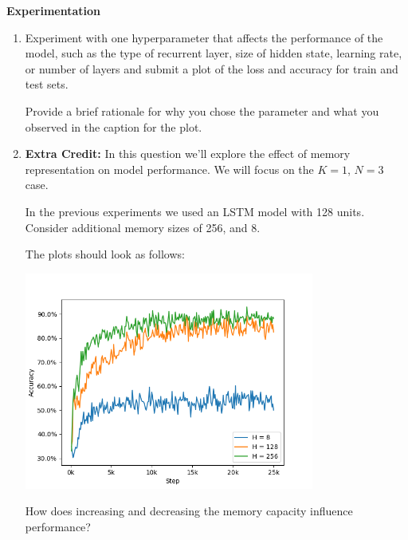 \item {} {\bf Experimentation}

\begin{enumerate}[label=\alph*]
    \item Experiment with one hyperparameter that affects the performance of the model, such as the type of recurrent layer, size of hidden state, learning rate, or number of layers and submit a plot of the loss and accuracy for train and test sets.
    
    Provide a brief rationale for why you chose the parameter and what you observed in the caption for the plot.    
    
    \item \textbf{Extra Credit:} In this question we'll explore the effect of memory representation on model performance. We will focus on the $K=1$, $N=3$ case.
    
    In the previous experiments we used an LSTM model with 128 units. Consider additional memory sizes of 256, and 8. 
    
    The plots should look as follows:
    \begin{center}
        \includegraphics[width = 0.75\textwidth]{./figures/soln4ii}
    \end{center}
    
    How does increasing and decreasing the memory capacity influence performance?
        
\end{enumerate}